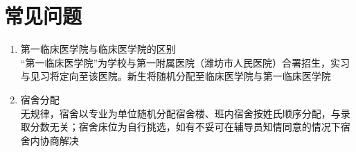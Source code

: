\section[常见问题]{常见问题}
\begin{enumerate}
    \item 第一临床医学院与临床医学院的区别\\
          “第一临床医学院”为学校与第一附属医院（潍坊市人民医院）合署招生，实习与见习将定向至该医院。新生将随机分配至临床医学院与第一临床医学院
    \item 宿舍分配\label{random_allocation}\\
          无规律，宿舍以专业为单位随机分配宿舍楼、班内宿舍按姓氏顺序分配，与录取分数无关；宿舍床位为自行挑选，如有不妥可在辅导员知情同意的情况下宿舍内协商解决
\end{enumerate}


